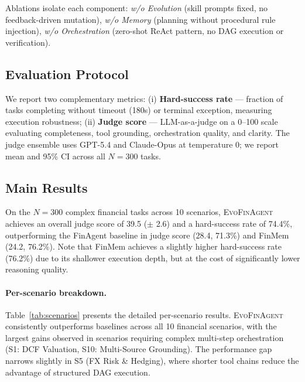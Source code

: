 \documentclass{article}
\begin{document}
Ablations isolate each component: \emph{w/o Evolution} (skill prompts fixed, no feedback-driven mutation), \emph{w/o Memory} (planning without procedural rule injection), \emph{w/o Orchestration} (zero-shot ReAct pattern, no DAG execution or verification).

\subsection{Evaluation Protocol}
We report two complementary metrics: (i) \textbf{Hard-success rate} — fraction of tasks completing without timeout (180s) or terminal exception, measuring execution robustness; (ii) \textbf{Judge score} — LLM-as-a-judge on a 0--100 scale evaluating completeness, tool grounding, orchestration quality, and clarity. The judge ensemble uses GPT-5.4 and Claude-Opus at temperature 0; we report mean and 95\% CI across all $N=300$ tasks.

\subsection{Main Results}
On the $N=300$ complex financial tasks across 10 scenarios, \textsc{EvoFinAgent} achieves an overall judge score of 39.5 ($\pm$ 2.6) and a hard-success rate of 74.4\%, outperforming the FinAgent baseline in judge score (28.4, 71.3\%) and FinMem (24.2, 76.2\%). Note that FinMem achieves a slightly higher hard-success rate (76.2\%) due to its shallower execution depth, but at the cost of significantly lower reasoning quality.

\paragraph{Per-scenario breakdown.}
Table~\ref{tab:scenarios} presents the detailed per-scenario results. \textsc{EvoFinAgent} consistently outperforms baselines across all 10 financial scenarios, with the largest gains observed in scenarios requiring complex multi-step orchestration (S1: DCF Valuation, S10: Multi-Source Grounding). The performance gap narrows slightly in S5 (FX Risk \& Hedging), where shorter tool chains reduce the advantage of structured DAG execution.
\end{document}
